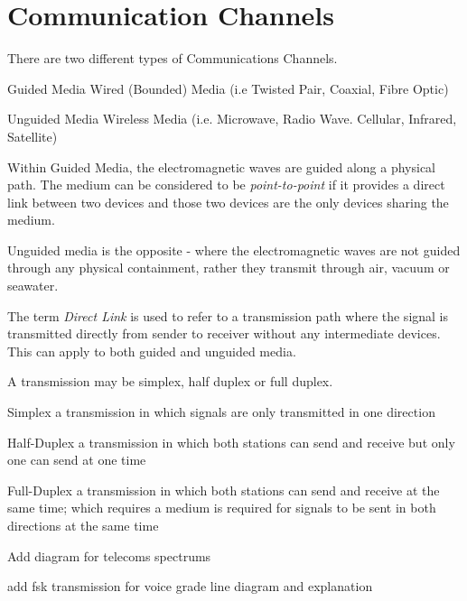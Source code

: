 
\section{Communication Channels}
There are two different types of Communications Channels.

\begin{define}
    \item[Guided Media] Wired (Bounded) Media (i.e Twisted Pair, Coaxial, Fibre Optic)
    \item[Unguided Media] Wireless Media (i.e. Microwave, Radio Wave. Cellular, Infrared, Satellite)
\end{define}

Within Guided Media, the electromagnetic waves are guided along a physical path. The medium can be considered to be \textit{point-to-point} if it provides a direct link between two devices and those two devices are the only devices sharing the medium.

Unguided media is the opposite - where the electromagnetic waves are not guided through any physical containment, rather they transmit through air, vacuum or seawater. 

The term \textit{Direct Link} is used to refer to a transmission path where the signal is transmitted directly from sender to receiver without any intermediate devices. This can apply to both guided and unguided media.

A transmission may be simplex, half duplex or full duplex.

\begin{define}
    \item[Simplex] a transmission in which signals are only transmitted in one direction
    \item[Half-Duplex] a transmission in which both stations can send and receive but only one can send at one time
    \item[Full-Duplex] a transmission in which both stations can send and receive at the same time; which requires a medium is required for signals to be sent in both directions at the same time
\end{define}


\begin{todo}
Add diagram for telecoms spectrums

add fsk transmission for voice grade line diagram and explanation
\end{todo}

